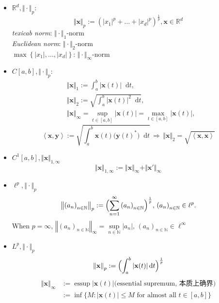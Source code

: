 \documentclass[
	border={25mm 20mm 25mm 30mm},  %
	varwidth,  %
	utf8,
]{standalone}
\newcommand\dd{\mathop{}\!\mathrm{d}}%
\begin{document}
\begin{itemize}
	\item \(\mathbb{R}^d, \Vert\cdot\Vert_p\):
	      \[\Vert\mathbf{x}\Vert_p:=\left(\left|x_1\right|^p+\ldots+\left|x_d\right|^p\right)^\frac{1}{p},\mathbf{x}\in\mathbb{R}^d\]
	      \textit{texicab norm}: \(\Vert\cdot\Vert_1\)-norm
	      \\\textit{Euclidean norm}: \(\Vert\cdot\Vert_2\)-norm
	      \\\(\max\left\{\left|x_1\right|,\ldots,\left|x_d\right|\right\}\): \(\Vert\cdot\Vert_\infty\)-norm
	\item \(C[a,b],\Vert\cdot\Vert_p\):
	      \begin{align*}
		       & \Vert\mathbf{x}\Vert_1:=\int_a^b{\left|\mathbf{x}(t)\right|\dd t},
		      \\&\Vert\mathbf{x}\Vert_2:=\sqrt{\int_a^b{\left|\mathbf{x}(t)\right|^2\dd t}},
		      \\&\Vert\mathbf{x}\Vert_\infty=\underset{t\in[a,b]}{\sup}\left|\mathbf{x}(t)\right|=\underset{t\in[a,b]}{\max}\left|\mathbf{x}(t)\right|,
	      \end{align*}
	      \[\left<\mathbf{x},\mathbf{y}\right>:=\sqrt{\int_a^b{\mathbf{x}(t)\big(\mathbf{y}(t)^*\big)\dd t}}\,\Longrightarrow\,\Vert\mathbf{x}\Vert_2=\sqrt{\left<\mathbf{x},\mathbf{x}\right>}\]
	\item \(C^1[a,b],\Vert\mathbf{x}\Vert_{1,\infty}\)
	      \[\Vert\mathbf{x}\Vert_{1,\infty}:=\Vert\mathbf{x}\Vert_\infty+\Vert{\mathbf{x}'}\Vert_\infty\]
	\item \(\ell^p,\Vert\cdot\Vert_p\)
	      \[\left\Vert\left(a_n\right)_{n\in\mathbb{N}}\right\Vert_p:=\Bigl(\sum_{n=1}^{\infty}{\left(a_n\right)_{n\in\mathbb{N}}}\Bigr)^\frac{1}{p},\,\left(a_n\right)_{n\in\mathbb{N}}\in\ell^p.\]
	      When \(p=\infty\), \(\left\Vert\left(a_n\right)_{n\in\mathbb{N}}\right\Vert_\infty=\underset{n\in\mathbb{N}}{\sup}\left|a_n\right|,\,\left(a_n\right)_{n\in\mathbb{N}}\in\ell^\infty\)
	\item \(L^p,\Vert\cdot\Vert_p\)
	      \[\left\Vert\mathbf{x}\right\Vert_p:=\Bigl(\int_a^b{\left|\mathbf{x}(t)\right|\dd t}\Bigr)^{\frac{1}{p}}\]
	      \begin{align*}
		      \left\Vert\mathbf{x}\right\Vert_\infty & :=\operatorname{essup}\left|\mathbf{x}(t)\right|\text{(essential supremum, 本质上确界)}
		      \\&:=\inf\bigl\{M:\left|\mathbf{x}(t)\right|\leqslant M\text{ for almost all }t\in[a,b]\bigr\}
	      \end{align*}
\end{itemize}
\end{document}
